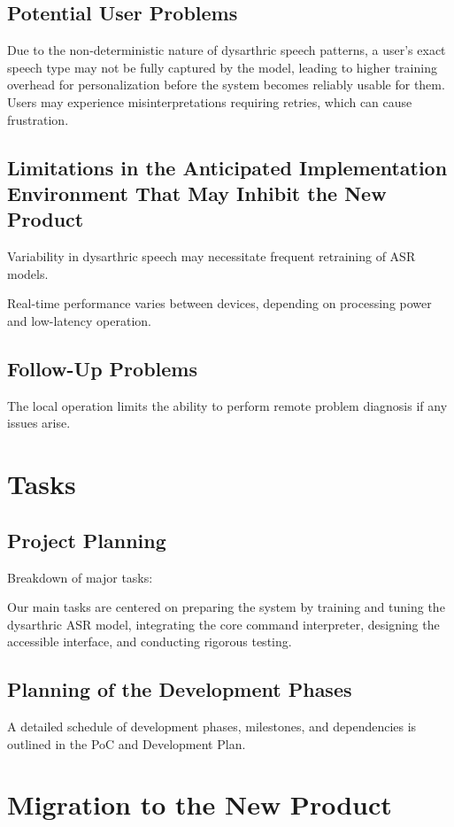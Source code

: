 \documentclass[12pt]{article}
\begin{document}
\subsection{Potential User Problems}
Due to the non-deterministic nature of dysarthric speech patterns, a user’s exact speech type may not be fully captured by the model, leading to higher training overhead for personalization before the system becomes reliably usable for them. Users may experience misinterpretations requiring retries, which can cause frustration.

\subsection{Limitations in the Anticipated Implementation Environment That May
Inhibit the New Product}
Variability in dysarthric speech may necessitate frequent retraining of ASR models.

Real-time performance varies between devices, depending on processing power and low-latency operation.
\subsection{Follow-Up Problems}
The local operation limits the ability to perform remote problem diagnosis if any issues arise.


\section{Tasks}
\subsection{Project Planning}
Breakdown of major tasks:

Our main tasks are centered on preparing the system by training and tuning the dysarthric ASR model, integrating the core command interpreter, designing the accessible interface, and conducting rigorous testing.
\subsection{Planning of the Development Phases}
A detailed schedule of development phases, milestones, and dependencies is outlined in the PoC and Development Plan.

\section{Migration to the New Product}
\end{document}
